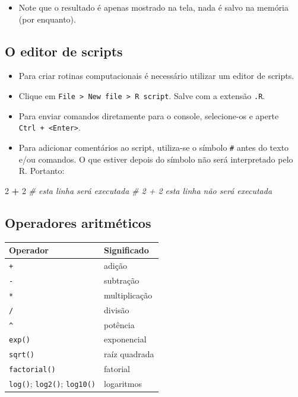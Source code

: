 \documentclass[10pt,a4paper]{book}
\newenvironment{Shaded}{\begin{snugshade}}{\end{snugshade}}
\newcommand{\DecValTok}[1]{\textcolor[rgb]{0.00,0.00,0.81}{#1}}
\newcommand{\StringTok}[1]{\textcolor[rgb]{0.31,0.60,0.02}{#1}}
\newcommand{\CommentTok}[1]{\textcolor[rgb]{0.56,0.35,0.01}{\textit{#1}}}
\newcommand{\OperatorTok}[1]{\textcolor[rgb]{0.81,0.36,0.00}{\textbf{#1}}}
\providecommand{\tightlist}{%
  \setlength{\itemsep}{0pt}\setlength{\parskip}{0pt}}
\begin{document}
\begin{itemize}
\tightlist
\item
  Note que o resultado é apenas mostrado na tela, nada é salvo na
  memória (por enquanto).
\end{itemize}

\subsection{O editor de scripts}\label{o-editor-de-scripts}

\begin{itemize}
\tightlist
\item
  Para criar rotinas computacionais é necessário utilizar um editor de
  scripts.
\item
  Clique em
  \texttt{File\ \textgreater{}\ New\ file\ \textgreater{}\ R\ script}.
  Salve com a extensão \texttt{.R}.
\item
  Para enviar comandos diretamente para o console, selecione-os e aperte
  \texttt{Ctrl\ +\ \textless{}Enter\textgreater{}}.
\item
  Para adicionar comentários ao script, utiliza-se o símbolo \texttt{\#}
  antes do texto e/ou comandos. O que estiver depois do símbolo não será
  interpretado pelo R. Portanto:
\end{itemize}

\begin{Shaded}
\begin{Highlighting}[]
\DecValTok{2} \OperatorTok{+}\StringTok{ }\DecValTok{2}     \CommentTok{# esta linha será executada}
\CommentTok{# 2 + 2     esta linha não será executada}
\end{Highlighting}
\end{Shaded}

\subsection{Operadores aritméticos}\label{operadores-aritmuxe9ticos}

\begin{longtable}[]{@{}ll@{}}
\toprule
Operador & Significado\tabularnewline
\midrule
\endhead
\texttt{+} & adição\tabularnewline
\texttt{-} & subtração\tabularnewline
\texttt{*} & multiplicação\tabularnewline
\texttt{/} & divisão\tabularnewline
\texttt{\^{}} & potência\tabularnewline
\texttt{exp()} & exponencial\tabularnewline
\texttt{sqrt()} & raíz quadrada\tabularnewline
\texttt{factorial()} & fatorial\tabularnewline
\texttt{log()}; \texttt{log2()}; \texttt{log10()} &
logaritmos\tabularnewline
\bottomrule
\end{longtable}
\end{document}

